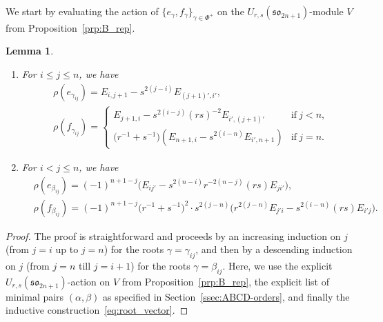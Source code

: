 \documentclass[pdftex]{sigma}
\numberwithin{equation}{section}
\newtheorem{Lemma}[Theorem]{Lemma}
\newcommand{\sso}{\mathfrak{so}}
\begin{document}
We start by evaluating the action of $\{e_\gamma,f_\gamma\}_{\gamma\in \Phi^+}$ on the $U_{r,s}(\sso_{2n+1})$-module $V$ from Proposition~\ref{prp:B_rep}.

\begin{Lemma}\label{lem:B-root-action}\quad\samepage
\begin{enumerate}\itemsep=0pt
\item[$(a)$] For $i\leq j\leq n$, we have
\begin{displaymath}
\begin{split}
 & \rho(e_{\gamma_{ij}}) = E_{i,j+1} - s^{2(j - i)}E_{(j + 1)',i'}, \\
 & \rho(f_{\gamma_{ij}}) =
 \begin{cases}
 E_{j + 1,i} - s^{2(i - j)}(rs)^{-2}E_{i',(j + 1)'} & \text{if}\ j < n ,\\
 \bigl(r^{-1} + s^{-1}\bigr)(E_{n + 1,i} - s^{2(i - n)}E_{i',n+1})& \text{if}\ j = n.
 \end{cases}
\end{split}
\end{displaymath}

\item[$(b)$] For $i<j\leq n$, we have
\begin{displaymath}
\begin{split}
 & \rho(e_{\beta_{ij}}) = (-1)^{n+ 1-j}\bigl(E_{ij'} - s^{2(n - i)}r^{-2(n - j)}(rs)E_{ji'}\bigr), \\
 & \rho(f_{\beta_{ij}}) = (-1)^{n+1-j}\bigl(r^{-1} + s^{-1}\bigr)^2\cdot s^{2(j-n)}
 \bigl(r^{2(j - n)}E_{j'i} - s^{2(i - n)}(rs)E_{i'j}\bigr).
\end{split}
\end{displaymath}
\end{enumerate}
\end{Lemma}

\begin{proof}
The proof is straightforward and proceeds by an increasing induction on $j$ (from $j=i$ up to $j=n$) for the roots $\gamma=\gamma_{ij}$, and then by a descending induction on $j$ (from $j=n$ till $j=i+1$) for the roots $\gamma=\beta_{ij}$. Here, we use the explicit $U_{r,s}(\sso_{2n+1})$-action on $V$ from Proposition~\ref{prp:B_rep}, the explicit list of minimal pairs $(\alpha,\beta)$ as specified in Section~\ref{ssec:ABCD-orders}, and finally the inductive construction~\eqref{eq:root_vector}.
\end{proof}
\end{document}
